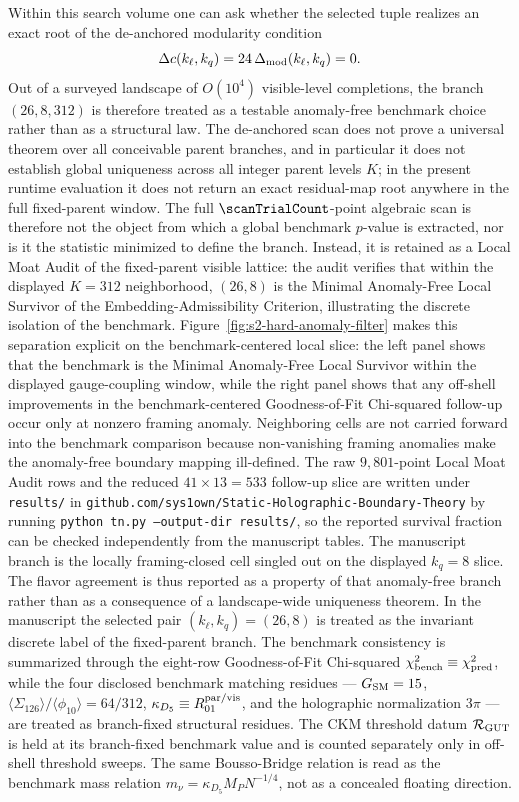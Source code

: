 \documentclass[11pt]{article}
\begin{document}
Within this search volume one can ask whether the selected tuple realizes an exact root of the de-anchored modularity condition
\begin{equation}
 \Delta c(k_{\ell},k_q)=24\,\Delta_{\rm mod}(k_{\ell},k_q)=0.
\end{equation}
Out of a surveyed landscape of $O(10^4)$ visible-level completions, the branch $(26,8,312)$ is therefore treated as a testable anomaly-free benchmark choice rather than as a structural law. The de-anchored scan does not prove a universal theorem over all conceivable parent branches, and in particular it does not establish global uniqueness across all integer parent levels $K$; in the present runtime evaluation it does not return an exact residual-map root anywhere in the full fixed-parent window. The full $\scanTrialCount$-point algebraic scan is therefore not the object from which a global benchmark $p$-value is extracted, nor is it the statistic minimized to define the branch. Instead, it is retained as a Local Moat Audit of the fixed-parent visible lattice: the audit verifies that within the displayed $K=312$ neighborhood, $(26,8)$ is the Minimal Anomaly-Free Local Survivor of the Embedding-Admissibility Criterion, illustrating the discrete isolation of the benchmark. Figure~\ref{fig:s2-hard-anomaly-filter} makes this separation explicit on the benchmark-centered local slice: the left panel shows that the benchmark is the Minimal Anomaly-Free Local Survivor within the displayed gauge-coupling window, while the right panel shows that any off-shell improvements in the benchmark-centered Goodness-of-Fit Chi-squared follow-up occur only at nonzero framing anomaly. Neighboring cells are not carried forward into the benchmark comparison because non-vanishing framing anomalies make the anomaly-free boundary mapping ill-defined. The raw $9{,}801$-point Local Moat Audit rows and the reduced $41\times13=533$ follow-up slice are written under \texttt{results/} in \texttt{github.com/sys1own/Static-Holographic-Boundary-Theory} by running \texttt{python tn.py --output-dir results/}, so the reported survival fraction can be checked independently from the manuscript tables. The manuscript branch is the locally framing-closed cell singled out on the displayed $k_q=8$ slice. The flavor agreement is thus reported as a property of that anomaly-free branch rather than as a consequence of a landscape-wide uniqueness theorem. In the manuscript the selected pair $(k_{\ell},k_q)=(26,8)$ is treated as the invariant discrete label of the fixed-parent branch. The benchmark consistency is summarized through the eight-row Goodness-of-Fit Chi-squared $\chi_{\rm bench}^2\equiv\chi_{\rm pred}^2$, while the four disclosed benchmark matching residues --- $G_{\rm SM}=15$, $\langle \Sigma_{126} \rangle / \langle \phi_{10} \rangle=64/312$, $\kappa_{D_5}\equiv R_{01}^{\rm par/vis}$, and the holographic normalization $3\pi$ --- are treated as branch-fixed structural residues. The CKM threshold datum $\mathcal R_{\rm GUT}$ is held at its branch-fixed benchmark value and is counted separately only in off-shell threshold sweeps. The same Bousso-Bridge relation is read as the benchmark mass relation $m_\nu=\kappa_{D_5}M_PN^{-1/4}$, not as a concealed floating direction. 
\end{document}
